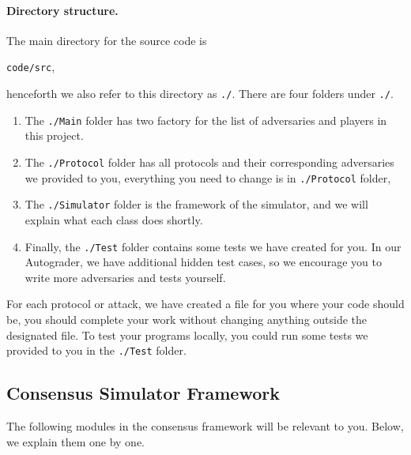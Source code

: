 \paragraph{Directory structure.}
The main directory for the source code is
\begin{center}
    \texttt{code/src},
\end{center}
\noindent henceforth we also refer to this directory as {\tt ./}.
There are four folders under {\tt ./}.
\begin{enumerate}[leftmargin=5mm]
    \item
    The {\tt ./Main} folder has two factory for the list of adversaries and players in this project.
    \item
          The {\tt ./Protocol} folder has all protocols and their corresponding adversaries we provided to you, everything you need to change is in {\tt ./Protocol} folder,
    \item
          The {\tt ./Simulator} folder is the framework of the simulator, and
          we will explain what each class does shortly.
    \item Finally, the {\tt ./Test} folder contains some tests we have created for you.
          In our Autograder, we have additional hidden test cases,
          so we encourage you to write more adversaries and tests yourself.
\end{enumerate}


For each protocol or attack, we have created a file for you where your code should be,
you should complete your work without changing anything outside the designated file. To test your programs locally, you could run some tests we provided to you in the {\tt ./Test} folder.


\subsection{Consensus Simulator Framework}

The following modules in the consensus framework will be relevant to you.
Below, we explain them one by one.


